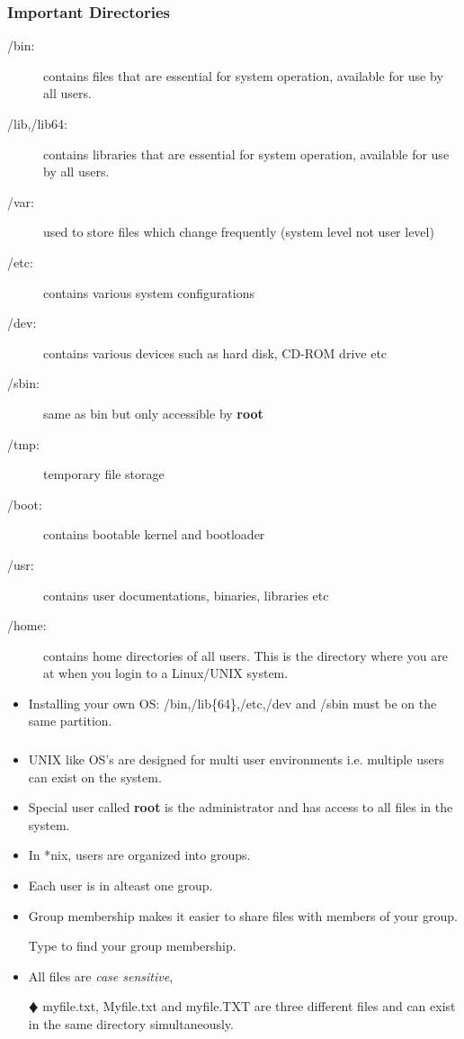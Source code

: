 \documentclass[10pt,t]{beamer}
\begin{document}
\begin{frame}
  \frametitle{Important Directories}
  \begin{description}
    \item[/bin:] contains files that are essential for system operation, available for use by all users.
    \item[/lib,/lib64:] contains libraries that are essential for system operation, available for use by all users.
    \item[/var:] used to store files which change frequently (system level not user level)
    \item[/etc:] contains various system configurations
    \item[/dev:] contains various devices such as hard disk, CD-ROM drive etc
    \item[/sbin:] same as bin but only accessible by \textbf{root}
    \item[/tmp:] temporary file storage
    \item[/boot:] contains bootable kernel and bootloader
    \item[/usr:] contains user documentations, binaries, libraries etc
    \item[/home:] contains home directories of all users. This is the directory where you are at when you login to a Linux/UNIX system.
  \end{description}
  \begin{itemize}
    \item Installing your own OS: /bin,/lib\{64\},/etc,/dev and /sbin must be on the same partition.
  \end{itemize}
\end{frame}

\begin{frame}[fragile]
  \frametitle{\small }
  \begin{itemize}
    \item UNIX like OS's are designed for multi user environments i.e. multiple users can exist on the system.
    \item Special user called \textbf{root} is the administrator and has access to all files in the system.
    \item In *nix, users are organized into groups.
    \item Each user is in alteast one group.
    \item Group membership makes it easier to share files with members of your group.
    \item[]Type  to find your group membership.
    \item All files are \textit{case sensitive},
    \item[$\vardiamond$] myfile.txt, Myfile.txt and myfile.TXT are three different files and can exist in the same directory simultaneously.
  \end{itemize}
\end{frame}
\end{document}
